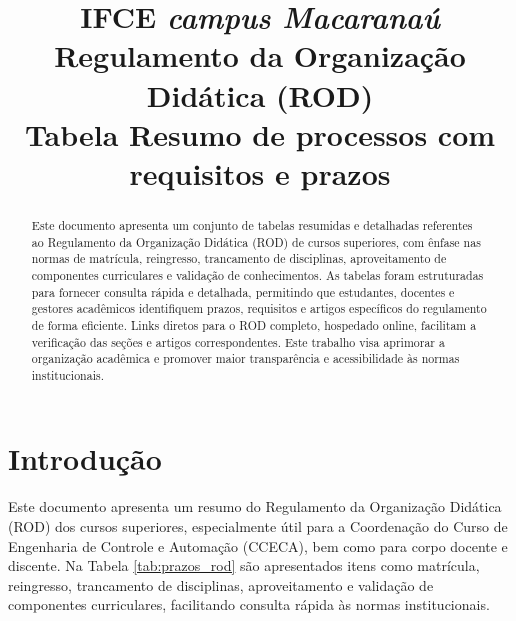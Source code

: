 \documentclass[authoryear]{elsarticle}
\begin{document}
	
	\begin{frontmatter}
		\title{IFCE \textit{campus Macaranaú}\\Regulamento da Organização Didática (ROD)\\
			Tabela Resumo de processos com requisitos e prazos}
		
		\begin{abstract}
			Este documento apresenta um conjunto de tabelas resumidas e detalhadas referentes ao Regulamento da Organização Didática (ROD) de cursos superiores, com ênfase nas normas de matrícula, reingresso, trancamento de disciplinas, aproveitamento de componentes curriculares e validação de conhecimentos. As tabelas foram estruturadas para fornecer consulta rápida e detalhada, permitindo que estudantes, docentes e gestores acadêmicos identifiquem prazos, requisitos e artigos específicos do regulamento de forma eficiente. Links diretos para o ROD completo, hospedado online, facilitam a verificação das seções e artigos correspondentes. Este trabalho visa aprimorar a organização acadêmica e promover maior transparência e acessibilidade às normas institucionais.
		\end{abstract}
		
	\end{frontmatter}
	
\section*{Introdução}
Este documento apresenta um resumo do Regulamento da Organização Didática (ROD) dos cursos superiores, especialmente útil para a Coordenação do Curso de Engenharia de Controle e Automação (CCECA), bem como para corpo docente e discente. Na Tabela \ref{tab:prazos_rod} são apresentados itens como matrícula, reingresso, trancamento de disciplinas, aproveitamento e validação de componentes curriculares, facilitando consulta rápida às normas institucionais.
\end{document}
